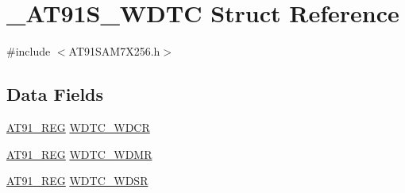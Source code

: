 \hypertarget{struct__AT91S__WDTC}{\section{\-\_\-\-A\-T91\-S\-\_\-\-W\-D\-T\-C Struct Reference}
\label{struct__AT91S__WDTC}
}


{\ttfamily \#include $<$A\-T91\-S\-A\-M7\-X256.\-h$>$}

\subsection*{Data Fields}
\begin{DoxyCompactItemize}
\item 
\hyperlink{GCC_2ARM7__AT91SAM7S_2AT91SAM7X256_8h_a712ad5a1ac1bd02f3e95a7526c283ce1}{A\-T91\-\_\-\-R\-E\-G} \hyperlink{struct__AT91S__WDTC_a83fe4eae922b8dd5b96b3e2609d0027b}{W\-D\-T\-C\-\_\-\-W\-D\-C\-R}
\item 
\hyperlink{GCC_2ARM7__AT91SAM7S_2AT91SAM7X256_8h_a712ad5a1ac1bd02f3e95a7526c283ce1}{A\-T91\-\_\-\-R\-E\-G} \hyperlink{struct__AT91S__WDTC_afb49315d8e3b7aa048339a1f9d78145e}{W\-D\-T\-C\-\_\-\-W\-D\-M\-R}
\item 
\hyperlink{GCC_2ARM7__AT91SAM7S_2AT91SAM7X256_8h_a712ad5a1ac1bd02f3e95a7526c283ce1}{A\-T91\-\_\-\-R\-E\-G} \hyperlink{struct__AT91S__WDTC_a2ecb6e3d2e39dbb08f6e797d337522c4}{W\-D\-T\-C\-\_\-\-W\-D\-S\-R}
\end{DoxyCompactItemize}


